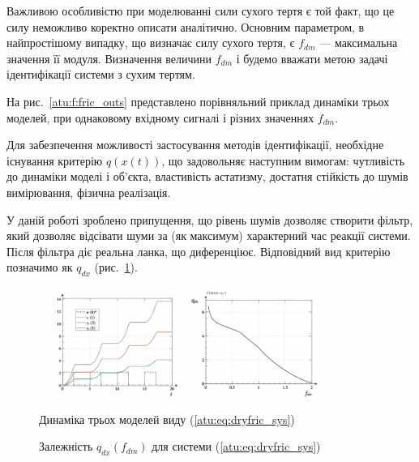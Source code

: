 \documentclass[a4paper,13pt]{atuaref}
\begin{document}
Важливою особливістю при моделюванні сили сухого тертя є той факт, що це силу
неможливо коректно описати аналітично. Основним параметром, в найпростішому
випадку, що визначає силу сухого тертя, є $f_{dm}$ --- максимальна значення її
модуля. Визначення величини  $f_{dm}$ і будемо вважати метою задачі ідентифікації
системи з сухим тертям.

На рис.~\ref{atu:f:fric_outs}
представлено порівняльний приклад динаміки трьох моделей,
при однаковому вхідному сигналі і різних значеннях $f_{dm}$.

Для забезпечення можливості застосування методів ідентифікації, необхідне
існування критерію $q(x(t))$, що задовольняє наступним вимогам: чутливість
до динаміки моделі і об'єкта, властивість астатизму, достатня стійкість до
шумів вимірювання, фізична реалізація.

У даній роботі зроблено припущення, що рівень шумів дозволяє створити фільтр, який
дозволяє відсівати шуми за (як максимум) характерний час реакції системи. Після
фільтра діє реальна ланка, що диференціює. Відповідний вид критерію позначимо як
$q_{dx}$ (рис.~\ref{atu:f:fric_q}).


\begin{figure}[htb!]
  {~} \hfill
  \includegraphics[width=0.40\textwidth]{p5/p/cha/fric/fric_outs1.png}
  \hfill
  \includegraphics[width=0.40\textwidth]{p5/p/cha/fric/fric_q-p_f_dm_q.png}
  \hfill {~}
  \\
  \parbox[t]{0.48\textwidth} {
    \caption{Динаміка трьох моделей виду (\ref{atu:eq:dryfric_sys})}
    \label{atu:f:fric_outs}
  } \hfill
  \parbox[t]{0.48\textwidth} {
    \caption{Залежність $q_{dx}(f_{dm})$ для системи (\ref{atu:eq:dryfric_sys}) }
    \label{atu:f:fric_q}
  }
\end{figure}
\end{document}
